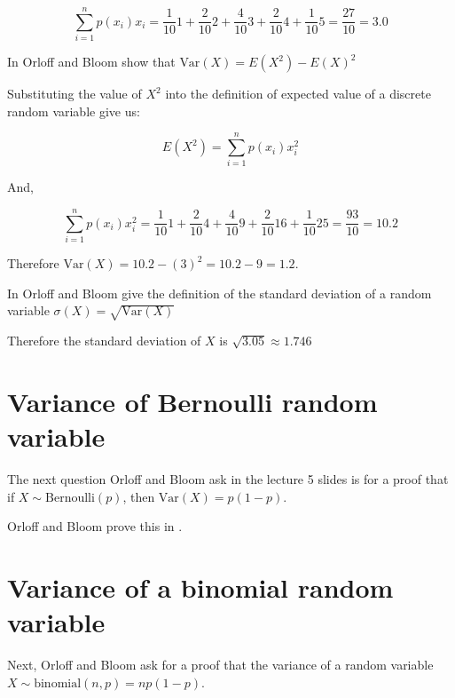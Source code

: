 \documentclass[a4paper,11pt]{article}
\begin{document}
\begin{equation}
      \sum_{i=1}^{n} p\left( x_{i} \right) x_i
  = \frac{1}{10} 1 + \frac{2}{10} 2 + \frac{4}{10} 3 + \frac{2}{10} 4 +
    \frac{1}{10} 5 = \frac{27}{10} = 3.0
\end{equation}

In \cite{reading5a} Orloff and Bloom show that
$\text{Var}\left(X \right) = E \left(X^{2}\right) - E\left( X \right)^{2}$

Substituting the value of $X^{2}$ into the definition of expected value of
a discrete random variable give us:

\begin{equation}
    E\left(X^{2} \right) =
      \sum_{i=1}^{n} p\left( x_{i} \right) x_i^{2}
\end{equation}

And,

\begin{equation}
    \sum_{i=1}^{n} p\left( x_{i} \right) x_i^{2}
    = \frac{1}{10} 1 + \frac{2}{10} 4 + \frac{4}{10} 9 + \frac{2}{10} 16 +
    \frac{1}{10} 25 = \frac{93}{10} = 10.2
\end{equation}

Therefore $\text{Var}\left( X \right) = 10.2 - \left( 3 \right)^{2}
  = 10.2 - 9 = 1.2$.

In \cite{reading5a} Orloff and Bloom give the definition of the standard
deviation of a random variable
$\sigma \left( X \right) = \sqrt{\text{Var}\left(X \right)}$

Therefore the standard deviation of $X$ is $\sqrt{3.05} \approx 1.746 $

\section{Variance of Bernoulli random variable}

The next question Orloff and Bloom ask in the lecture 5 slides is for a proof
that if $X \sim \text{Bernoulli} \left( p \right)$, then
$\text{Var}\left( X \right) = p\left( 1-p \right)$.

Orloff and Bloom prove this in \cite{reading5a}.

\section{Variance of a binomial random variable}

Next, Orloff and Bloom ask for a proof that the variance of a random variable
$X \sim \text{binomial}\left(n, p \right) = np \left( 1 - p \right)$.
\end{document}

